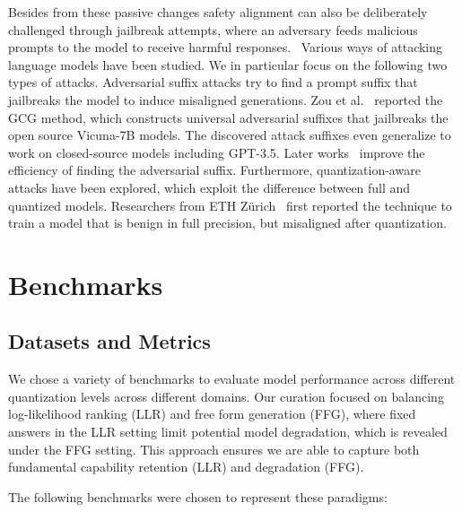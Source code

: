 \documentclass{article}
\begin{document}
Besides from these passive changes safety alignment can also be deliberately challenged through jailbreak attempts, where an adversary feeds malicious prompts to the model to receive harmful responses.~\cite{wei2023jailbrokendoesllmsafety, shen2024donowcharacterizingevaluating}
Various ways of attacking language models have been studied. We in particular focus on the following two types of attacks. Adversarial suffix attacks try to find a prompt suffix that jailbreaks the model to induce misaligned generations. Zou et al.~\cite{GCG} reported the GCG method,
 which constructs universal adversarial suffixes that jailbreaks the open source Vicuna-7B models. The discovered attack suffixes even generalize to work on closed-source models including GPT-3.5. 
Later works~\cite{Faster-GCG,I-GCG} improve the efficiency of finding the adversarial suffix.
Furthermore, quantization-aware attacks have been explored, which exploit the difference between full and quantized models. Researchers from ETH Zürich~\cite{QCB} first reported the technique to train a model that is benign in full precision, but misaligned after quantization.

\section{Benchmarks}
\subsection{Datasets and Metrics}

We chose a variety of benchmarks to evaluate model performance across different quantization levels across different domains. Our curation focused on balancing log-likelihood ranking (LLR) and free form generation (FFG), where fixed answers in the LLR setting limit potential model degradation, which is revealed under the FFG setting. This approach ensures we are able to capture both fundamental capability retention (LLR) and degradation (FFG).

The following benchmarks were chosen to represent these paradigms:
\end{document}

